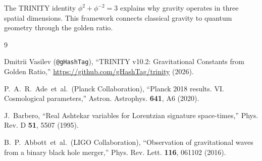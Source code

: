 \documentclass[12pt,a4paper]{article}
\begin{document}
The TRINITY identity $\phi^2 + \phi^{-2} = 3$ explains why gravity operates in three spatial dimensions. This framework connects classical gravity to quantum geometry through the golden ratio.

\begin{thebibliography}{9}

Dmitrii Vasilev (\texttt{@gHashTag}),
``TRINITY v10.2: Gravitational Constants from Golden Ratio,''
\url{https://github.com/gHashTag/trinity} (2026).

P.~A.~R.~Ade~et~al.~(Planck Collaboration),
``Planck 2018 results. VI. Cosmological parameters,''
Astron. Astrophys. \textbf{641}, A6 (2020).

J.~Barbero,
``Real Ashtekar variables for Lorentzian signature space-times,''
Phys. Rev. D \textbf{51}, 5507 (1995).

B.~P.~Abbott~et~al.~(LIGO Collaboration),
``Observation of gravitational waves from a binary black hole merger,''
Phys. Rev. Lett. \textbf{116}, 061102 (2016).

\end{thebibliography}
\end{document}
